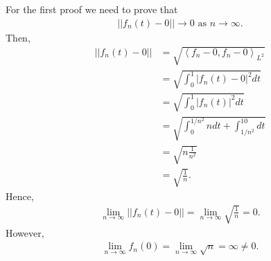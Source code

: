 \begin{questions}

\begin{solution}
For the first proof we need to prove that
\begin{align*}
||f_n(t)-0||\rightarrow 0\text{ as } n\rightarrow\infty.
\end{align*}
Then,
\begin{align*}
||f_n(t)-0||&=\sqrt{\left<f_n-0,f_n-0\right>_{L^2}}\\
&=\sqrt{\int_0^1\left|f_n(t)-0\right|^2dt}\\
&=\sqrt{\int_0^1\left|f_n(t)\right|^2dt}\\
&=\sqrt{\int_0^{1/n^2}ndt+\int_{1/n^2}^10dt}\\
&=\sqrt{n\frac{1}{n^2}}\\
&=\sqrt{\frac{1}{n}}.
\end{align*}
Hence,
\begin{align*}
\lim_{n\rightarrow\infty}||f_n(t)-0||=\lim_{n\rightarrow\infty}\sqrt{\frac{1}{n}}=0.
\end{align*}
However,
\begin{align*}
\lim_{n\rightarrow\infty}f_n(0)=\lim_{n\rightarrow\infty}\sqrt{n}=\infty\neq 0.
\end{align*}
\end{solution}
\end{questions}
